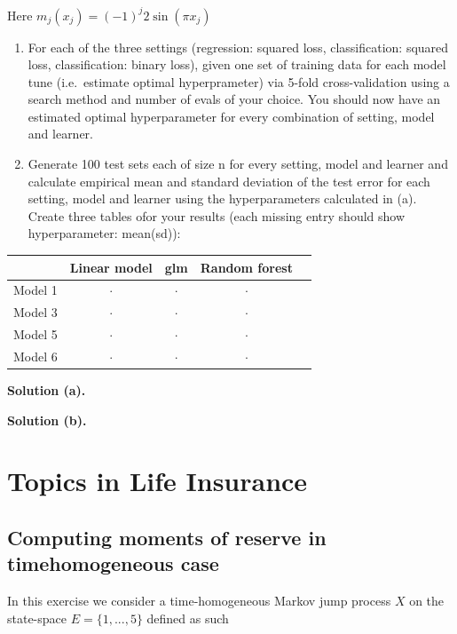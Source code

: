 \documentclass[
]{book}
\providecommand{\tightlist}{%
  \setlength{\itemsep}{0pt}\setlength{\parskip}{0pt}}
\begin{document}
Here \(m_j(x_j)=(-1)^j2\sin(\pi x_j)\)

\begin{enumerate}
\def\labelenumi{\alph{enumi}.}
\tightlist
\item
  For each of the three settings (regression: squared loss, classification: squared loss, classification: binary loss), given one set of training data for each model tune (i.e.~estimate optimal hyperprameter) via 5-fold cross-validation using a search method and number of evals of your choice. You should now have an estimated optimal hyperparameter for every combination of setting, model and learner.
\item
  Generate 100 test sets each of size n for every setting, model and learner and calculate empirical mean and standard deviation of the test error for each setting, model and learner using the hyperparameters calculated in (a). Create three tables ofor your results (each missing entry should show hyperparameter: mean(sd)):
\end{enumerate}

\begin{longtable}[]{@{}lcccc@{}}
\toprule()
& Linear model & glm & Random forest & \\
\midrule()
\endhead
Model 1 & \(\cdot\) & \(\cdot\) & \(\cdot\) & \\
Model 3 & \(\cdot\) & \(\cdot\) & \(\cdot\) & \\
Model 5 & \(\cdot\) & \(\cdot\) & \(\cdot\) & \\
Model 6 & \(\cdot\) & \(\cdot\) & \(\cdot\) & \\
\bottomrule()
\end{longtable}

\textbf{Solution (a).}

\textbf{Solution (b).}

\hypertarget{topics-in-life-insurance}{%
\chapter{Topics in Life Insurance}\label{topics-in-life-insurance}}

\hypertarget{computing-moments-of-reserve-in-timehomogeneous-case}{%
\section{Computing moments of reserve in timehomogeneous case}\label{computing-moments-of-reserve-in-timehomogeneous-case}}

In this exercise we consider a time-homogeneous Markov jump process \(X\) on the state-space \(E=\{1,...,5\}\) defined as such
\end{document}
